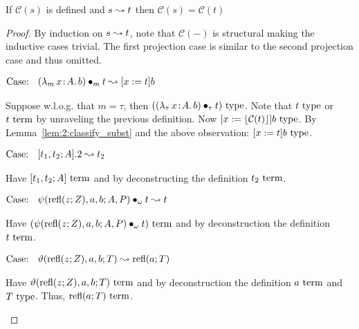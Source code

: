\begin{lemma}
    \label{lem:2:classify_preservation_step}
    If $\mathcal{C}(s)$ is defined and $s \leadsto t$ then $\mathcal{C}(s) = \mathcal{C}(t)$
\end{lemma}
\begin{proof}
    By induction on $s \leadsto t$, note that $\mathcal{C}(-)$ is structural making the inductive cases trivial.
    The first projection case is similar to the second projection case and thus omitted.

    $\text{Case: }\begin{array}{c} ({\lambda_m}\, x\! : \! A.\, b) \bullet_{m} t \leadsto [x := t]b \end{array}$
    \begin{proofcase}
        Suppose w.l.o.g. that $m = \tau$, then $(({\lambda_\tau}\, x\! : \! A.\, b) \bullet_{\tau} t)~\textnormal{type}$.
        Note that $t~\textnormal{type}$ or $t~\textnormal{term}$ by unraveling the previous definition.
        Now $[x := \lfloor \mathcal{C}(t) \rfloor]b~\textnormal{type}$.
        By Lemma~\ref{lem:2:classify_subst} and the above observation: $[x := t]b~\textnormal{type}$.
    \end{proofcase}

    $\text{Case: }\begin{array}{c} [t_1, t_2; A].2 \leadsto t_2 \end{array}$
    \begin{proofcase}
        Have $[t_1, t_2; A]~\textnormal{term}$ and by deconstructing the definition $t_2~\textnormal{term}$.
    \end{proofcase}

    $\text{Case: }\begin{array}{c} \psi(\text{refl}(z; Z), a, b; A, P) \bullet_{\omega} t \leadsto t \end{array}$
    \begin{proofcase}
        Have $(\psi(\text{refl}(z; Z), a, b; A, P) \bullet_{\omega} t)~\textnormal{term}$ and by deconstruction the definition $t~\textnormal{term}$.
    \end{proofcase}

    $\text{Case: }\begin{array}{c} \vartheta(\text{refl}(z; Z), a, b; T) \leadsto \text{refl}(a; T) \end{array}$
    \begin{proofcase}
        Have $\vartheta(\text{refl}(z; Z), a, b; T)~\textnormal{term}$ and by deconstruction the definition $a~\textnormal{term}$ and $T~\textnormal{type}$.
        Thus, $\text{refl}(a; T)~\textnormal{term}$.
    \end{proofcase}
\end{proof}

